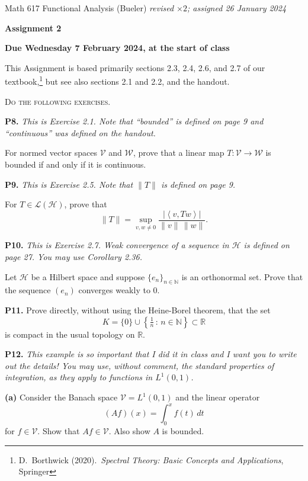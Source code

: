 \documentclass[12pt]{amsart}
\newcommand{\cH}{\mathcal{H}}
\newcommand{\cL}{\mathcal{L}}
\newcommand{\cV}{\mathcal{V}}
\newcommand{\cW}{\mathcal{W}}
\newcommand{\NN}{\mathbb{N}}
\newcommand{\RR}{\mathbb{R}}
\newcommand{\ip}[2]{\ensuremath{\left<#1,#2\right>}}
\newcommand{\prob}[1]{\bigskip\noindent\textbf{#1.}\quad }
\newcommand{\epart}[1]{\medskip\noindent\textbf{(#1)}\quad }
\newcommand{\nex}{\medskip\noindent}
\begin{document}
\scriptsize \noindent Math 617 Functional Analysis (Bueler) \hfill \emph{revised $\times 2$; assigned 26 January 2024}
\normalsize\medskip

\Large\centerline{\textbf{Assignment 2}}
\large
\medskip

\centerline{\textbf{Due Wednesday 7 February 2024, at the start of class}}
\medskip
\normalsize

\thispagestyle{empty}

\bigskip
\noindent This Assignment is based primarily sections 2.3, 2.4, 2.6, and 2.7 of our textbook,\footnote{D.~Borthwick (2020).~\emph{Spectral Theory: Basic Concepts and Applications}, Springer} but see also sections 2.1 and 2.2, and the handout.

\medskip
\noindent \textsc{Do the following exercises.}
\smallskip

\prob{P8}  \emph{This is Exercise 2.1.  Note that ``bounded'' is defined on page 9 and ``continuous'' was defined on the handout.}

\nex For normed vector spaces $\cV$ and $\cW$, prove that a linear map $T:\cV\to\cW$ is bounded if and only if it is continuous.


\prob{P9}  \emph{This is Exercise 2.5.  Note that $\|T\|$ is defined on page 9.}

\nex For $T\in\cL(\cH)$, prove that
	$$\|T\| = \sup_{v,w\ne 0} \frac{|\ip{v}{Tw}|}{\|v\|\,\|w\|}.$$


\prob{P10}  \emph{This is Exercise 2.7.  Weak convergence of a sequence in $\cH$ is defined on page 27.  You may use Corollary 2.36.}

\nex Let $\cH$ be a Hilbert space and suppose $\{e_n\}_{n\in\NN}$ is an orthonormal set.  Prove that the sequence $(e_n)$ converges weakly to 0. 


\prob{P11}  Prove directly, without using the Heine-Borel theorem, that the set
	$$K = \{0\} \cup \left\{\tfrac{1}{n}\,:\,n \in \NN\right\} \subset \RR$$
is compact in the usual topology on $\RR$.


\clearpage \newpage
\prob{P12}  \emph{This example is so important that I did it in class \emph{and} I want you to write out the details!  You may use, without comment, the standard properties of integration, as they apply to functions in $L^1(0,1)$.}

\epart{a}  Consider the Banach space $\cV = L^1(0,1)$ and the linear operator
	$$(Af)(x) = \int_0^x f(t)\,dt$$
for $f\in\cV$.  Show that $Af \in \cV$.  Also show $A$ is bounded.
\end{document}
